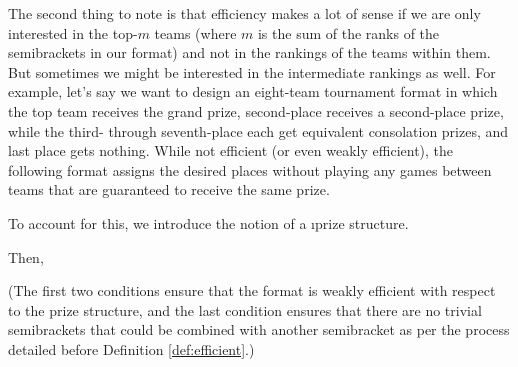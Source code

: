 {    The second thing to note is that efficiency makes a lot of sense if we are only interested in the top-$m$ teams (where $m$ is the sum of the ranks of the semibrackets in our format) and not in the rankings of the teams within them. But sometimes we might be interested in the intermediate rankings as well. For example, let's say we want to design an eight-team tournament format in which the top team receives the grand prize, second-place receives a second-place prize, while the third- through seventh-place each get equivalent consolation prizes, and last place gets nothing. While not efficient (or even weakly efficient), the following format assigns the desired places without playing any games between teams that are guaranteed to receive the same prize.


    To account for this, we introduce the notion of a \i{prize structure}.
    

    Then,


    (The first two conditions ensure that the format is weakly efficient with respect to the prize structure, and the last condition ensures that there are no trivial semibrackets that could be combined with another semibracket as per the process detailed before Definition \ref{def:efficient}.)

}
